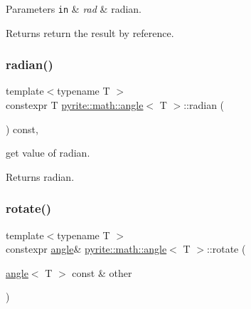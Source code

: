 \begin{DoxyParams}[1]{Parameters}
\mbox{\tt in}  & {\em rad} & radian. \\
\hline
\end{DoxyParams}
\begin{DoxyReturn}{Returns}
return the result by reference. 
\end{DoxyReturn}
\mbox{\label{classpyrite_1_1math_1_1angle_a01c42dc88f49b1b945e187aa2c5f190a}} 
\subsubsection{\texorpdfstring{radian()}{radian()}\hspace{0.1cm}{\footnotesize\ttfamily [2/2]}}
{\footnotesize\ttfamily template$<$typename T $>$ \\
constexpr T \mbox{\hyperlink{classpyrite_1_1math_1_1angle}{pyrite\+::math\+::angle}}$<$ T $>$\+::radian (\begin{DoxyParamCaption}{ }\end{DoxyParamCaption}) const\hspace{0.3cm}{\ttfamily [inline]}, {\ttfamily [noexcept]}}

get value of radian. \begin{DoxyReturn}{Returns}
radian. 
\end{DoxyReturn}
\mbox{\label{classpyrite_1_1math_1_1angle_a3beefc40aadf5528ee5fd76823d98420}} 
\subsubsection{\texorpdfstring{rotate()}{rotate()}}
{\footnotesize\ttfamily template$<$typename T $>$ \\
constexpr \mbox{\hyperlink{classpyrite_1_1math_1_1angle}{angle}}\& \mbox{\hyperlink{classpyrite_1_1math_1_1angle}{pyrite\+::math\+::angle}}$<$ T $>$\+::rotate (\begin{DoxyParamCaption}\item[{\mbox{\hyperlink{classpyrite_1_1math_1_1angle}{angle}}$<$ T $>$ const \&}]{other }\end{DoxyParamCaption})\hspace{0.3cm}{\ttfamily [inline]}}

